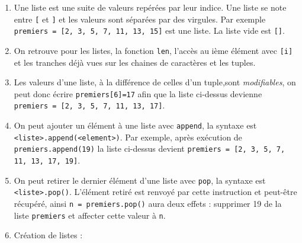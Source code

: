 \documentclass[11pt,a4paper]{article}
\begin{document}
	\begin{tcolorbox}[left=0cm,title=\bf{\faPython \; Listes},colbacktitle=cfond]
		\begin{enumerate}
			\item[\ding{182}] Une liste est une suite de valeurs repérées par leur indice. Une liste se note entre {\tt [} et {\tt]} et les valeurs sont séparées par des virgules. Par exemple \texttt{premiers = [2, 3, 5, 7, 11, 13, 15]} est une liste. La liste vide est {\tt []}.
			\item[\ding{183}] On retrouve pour les listes, la fonction {\tt len}, l'accès au  ième élément avec {\tt [i]} et les tranches déjà vues sur les chaines de caractères et les tuples.
			\item[\ding{184}] Les valeurs d'une liste, à la différence de celles d'un tuple,sont \textit{modifiables}, on peut donc écrire \texttt{premiers[6]=17} afin que la liste ci-dessus devienne \texttt{premiers = [2, 3, 5, 7, 11, 13, 17]}.
			\item[\ding{185}] On peut ajouter un élément à une liste avec {\tt append}, la syntaxe est {\tt <liste>.append(<element>)}. Par exemple, après exécution de \texttt{premiers.append(19)} la liste ci-dessus devient \texttt{premiers = [2, 3, 5, 7, 11, 13, 17, 19]}.
			\item[\ding{186}] On peut retirer le dernier élément d'une liste avec {\tt pop}, la syntaxe est {\tt <liste>.pop()}. L'élément retiré est renvoyé par cette instruction et peut-être récupéré, ainsi \texttt{n = premiers.pop()} aura deux effets : supprimer 19 de la liste {\tt premiers} et affecter cette valeur à {\tt n}.
			\item[\ding{187}] Création de listes :
		\end{enumerate}
	\end{tcolorbox}
	
\end{document}

